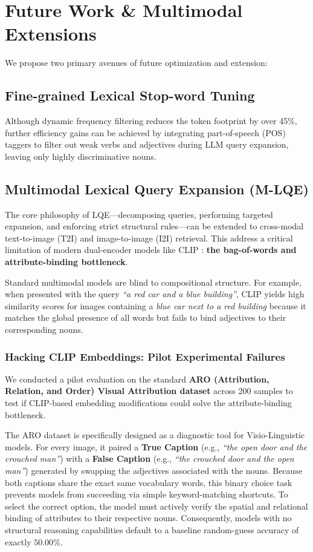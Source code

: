 \documentclass[11pt,a4paper]{article}
\begin{document}
\section{Future Work \& Multimodal Extensions}
We propose two primary avenues of future optimization and extension:

\subsection{Fine-grained Lexical Stop-word Tuning}
Although dynamic frequency filtering reduces the token footprint by over 45\%, further efficiency gains can be achieved by integrating part-of-speech (POS) taggers to filter out weak verbs and adjectives during LLM query expansion, leaving only highly discriminative nouns.

\subsection{Multimodal Lexical Query Expansion (M-LQE)}
The core philosophy of LQE---decomposing queries, performing targeted expansion, and enforcing strict structural rules---can be extended to cross-modal text-to-image (T2I) and image-to-image (I2I) retrieval. This address a critical limitation of modern dual-encoder models like CLIP \cite{radford2021learning}: \textbf{the bag-of-words and attribute-binding bottleneck}.

Standard multimodal models are blind to compositional structure. For example, when presented with the query \textit{``a red car and a blue building''}, CLIP yields high similarity scores for images containing a \textit{blue car next to a red building} because it matches the global presence of all words but fails to bind adjectives to their corresponding nouns.

\subsubsection{Hacking CLIP Embeddings: Pilot Experimental Failures}
We conducted a pilot evaluation on the standard \textbf{ARO (Attribution, Relation, and Order) Visual Attribution dataset} \cite{yuksekgonul2022and} across 200 samples to test if CLIP-based embedding modifications could solve the attribute-binding bottleneck. 

The ARO dataset is specifically designed as a diagnostic tool for Visio-Linguistic models. For every image, it paired a \textbf{True Caption} (e.g., \textit{``the open door and the crouched man''}) with a \textbf{False Caption} (e.g., \textit{``the crouched door and the open man''}) generated by swapping the adjectives associated with the nouns. Because both captions share the exact same vocabulary words, this binary choice task prevents models from succeeding via simple keyword-matching shortcuts. To select the correct option, the model must actively verify the spatial and relational binding of attributes to their respective nouns. Consequently, models with no structural reasoning capabilities default to a baseline random-guess accuracy of exactly $50.00\%$.
\end{document}
